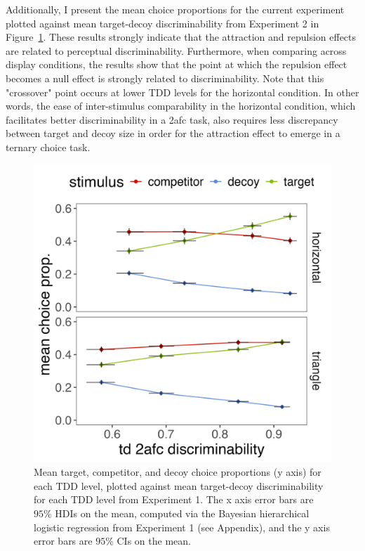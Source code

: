 Additionally, I present the mean choice proportions for the current experiment plotted against mean target-decoy discriminability from Experiment 2 in Figure~\ref{fig:e2_choice_compare_to_2afc}. These results strongly indicate that the attraction and repulsion effects are related to perceptual discriminability. Furthermore, when comparing across display conditions, the results show that the point at which the repulsion effect becomes a null effect is strongly related to discriminability. Note that this "crossover" point occurs at lower TDD levels for the horizontal condition. In other words, the ease of inter-stimulus comparability in the horizontal condition, which facilitates better discriminability in a 2afc task, also requires less discrepancy between target and decoy size in order for the attraction effect to emerge in a ternary choice task.

\begin{figure}
   \includegraphics[width=\textwidth]{figures/choicePhase_att_trials_compare_to_2afc_collapsed.jpeg}
   \caption{Mean target, competitor, and decoy choice proportions (y axis) for each TDD level, plotted against mean target-decoy discriminability for each TDD level from Experiment 1. The x axis error bars are $95\%$ HDIs on the mean, computed via the Bayesian hierarchical logistic regression from Experiment 1 (see Appendix), and the y axis error bars are $95\%$ CIs on the mean.}
   \label{fig:e2_choice_compare_to_2afc}
\end{figure}


